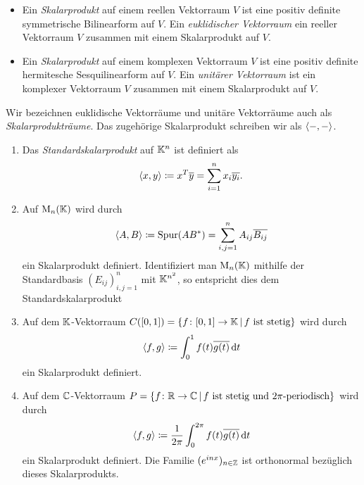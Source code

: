 \begin{definition}
  \leavevmode
  \begin{itemize}
    \item
      Ein \emph{Skalarprodukt} auf einem reellen Vektorraum $V$ ist eine positiv definite symmetrische Bilinearform auf $V$.
      Ein \emph{euklidischer Vektorraum} ein reeller Vektorraum $V$ zusammen mit einem Skalarprodukt auf $V$.
    \item
      Ein \emph{Skalarprodukt} auf einem komplexen Vektorraum $V$ ist eine positiv definite hermitesche Sesquilinearform auf $V$.
      Ein \emph{unitärer Vektorraum} ist ein komplexer Vektorraum $V$ zusammen mit einem Skalarprodukt auf $V$.
  \end{itemize}

  Wir bezeichnen euklidische Vektorräume und unitäre Vektorräume auch als \emph{Skalarprodukträume}.
  Das zugehörige Skalarprodukt schreiben wir als $\left\langle -, - \right\rangle$.
\end{definition}



\begin{example}
  \leavevmode
  \begin{enumerate}
    \item
      Das \emph{Standardskalarprodukt} auf $\mathbb{K}^n$ ist definiert als
      \[
                  \left\langle x, y \right\rangle
        \coloneqq x^T \overline{y}
        =         \sum_{i=1}^n x_i \overline{y_i}.
      \]
    \item
      Auf $\operatorname{M}_{n}(\mathbb{K})$ wird durch
      \[
                  \left\langle A, B \right\rangle
        \coloneqq \operatorname{Spur} (A B^*)
        =         \sum_{i,j = 1}^n A_{ij} \overline{B_{ij}}
      \]
      ein Skalarprodukt definiert.
      Identifiziert man $\operatorname{M}_{n}(\mathbb{K})$ mithilfe der Standardbasis $(E_{ij})_{i,j = 1}^n$ mit $\mathbb{K}^{n^2}$, so entspricht dies dem Standardskalarprodukt

    \item
      Auf dem $\mathbb{K}$-Vektorraum $C([0,1]) = \{f \colon [0,1] \to \mathbb{K} \,|\, \text{$f$ ist stetig} \}$ wird durch
      \[
                  \left\langle f, g \right\rangle
        \coloneqq \int_0^1 f(t) \overline{g(t)} \,\text{d}t
      \]
      ein Skalarprodukt definiert.
    \item
      Auf dem $\mathbb{C}$-Vektorraum $P = \{f \colon \mathbb{R} \to \mathbb{C} \,|\, \text{$f$ ist stetig und $2\pi$-periodisch} \}$ wird durch
      \[
                  \left\langle f, g \right\rangle
        \coloneqq \frac{1}{2\pi} \int_0^{2\pi} f(t) \overline{g(t)} \,\text{d}t
      \]
      ein Skalarprodukt definiert.
      Die Familie $(e^{inx})_{n \in \mathbb{Z}}$ ist orthonormal bezüglich dieses Skalarprodukts.
  \end{enumerate}
\end{example}

